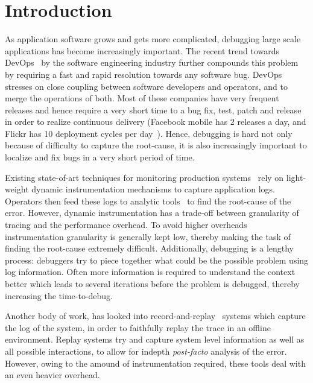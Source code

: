 
\section{Introduction}
\label{sec:intro}

\noindent
As application software grows and gets more complicated, debugging large scale applications has become increasingly important. 
The recent trend towards DevOps~\cite{devops} by the software engineering industry further compounds this problem by requiring a fast and rapid resolution towards any software bug.
DevOps stresses on close coupling between software developers and operators, and to merge the operations of both. 
Most of these companies have very frequent releases and hence require a very short time to a bug fix, test, patch and release in order to realize continuous delivery (Facebook mobile has 2 releases a day, and Flickr has 10 deployment cycles per day~\cite{10DevOps}).
Hence, debugging is hard not only because of difficulty to capture the root-cause, it is also increasingly important to localize and fix bugs in a very short period of time.

\noindent
Existing state-of-art techniques for monitoring production systems~\cite{dtrace, iProbe, winetw} rely on light-weight dynamic instrumentation mechanisms to capture application logs. 
Operators then feed these logs to analytic tools~\cite{magpie,clue} to find the root-cause of the error.
However, dynamic instrumentation has a trade-off between granularity of tracing and the performance overhead. 
To avoid higher overheads instrumentation granularity is generally kept low, thereby making the task of finding the root-cause extremely difficult.
Additionally, debugging is a lengthy process: debuggers try to piece together what could be the possible problem using log information.
Often more information is required to understand the context better which leads to several iterations before the problem is debugged, thereby increasing the time-to-debug.

\noindent
Another body of work, has looked into record-and-replay~\cite{odr,revirt,laadan2010transparent,geels2007friday} systems which capture the log of the system, in order to faithfully replay the trace in an offline environment.
Replay systems try and capture system level information as well as all possible interactions, to allow for indepth \textit{post-facto} analysis of the error.
However, owing to the amound of instrumentation required, these tools deal with an even heavier overhead.

